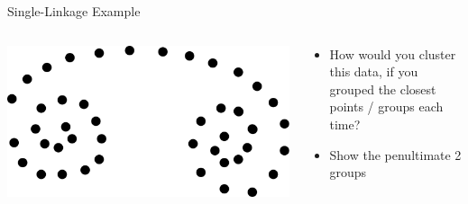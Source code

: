 \documentclass[aspectratio=169]{beamer}
\begin{document}
\begin{frame}{Single-Linkage Example}

\begin{columns}
\begin{column}{0.5\textwidth}
\includegraphics[width=1\textwidth]{./lectUL/singleLinkNoGroups.pdf}
\end{column}
\begin{column}{0.5\textwidth}
\begin{itemize}
\item How would you cluster this data, if you grouped the closest points  / groups each time?
\item Show the penultimate 2  groups
\end{itemize}
\end{column}
\end{columns}
\end{frame}
\end{document}

